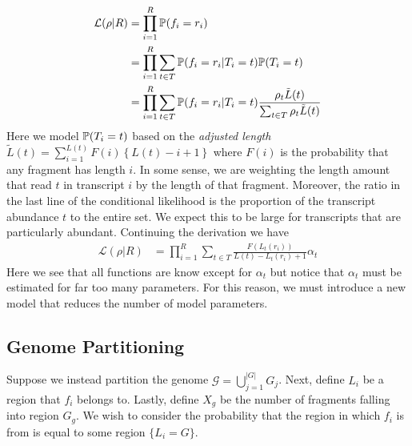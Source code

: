 \documentclass[11pt]{article}
\begin{document}
\begin{align*}
\mathcal{L}(\rho|R) &= \prod_{i=1}^{R}{\mathbb{P}}(f_i = r_i)\\
&= \prod_{i=1}^{R}\sum_{t\in T}{\mathbb{P}}(f_i = r_i|T_{i} = t){\mathbb{P}}(T_i = t)\\
&= \prod_{i=1}^{R}\sum_{t\in T}{\mathbb{P}}(f_i = r_i|T_{i} = t)\frac{\rho_t\tilde{L}(t)}{\sum_{t\in T}\rho_{t}\tilde{L}(t)}\\
\end{align*}
Here we model ${\mathbb{P}}(T_i = t)$ based on the \textit{adjusted length} $\tilde{L}(t) = \sum_{i = 1}^{L(t)}F(i)\left\{L(t) - i + 1\right\}$ where $F(i)$ is the probability that any fragment has length $i$. In some sense, we are weighting the length amount that read $t$ in transcript $i$ by the length of that fragment. Moreover, the ratio in the last line of the conditional likelihood is the proportion of the transcript abundance $t$ to the entire set. We expect this to be large for transcripts that are particularly abundant. Continuing the derivation we have 
\begin{align*}
\mathcal{L}(\rho|R)&=\prod_{i=1}^R\sum_{t \in T}\frac{F(L_{t}(r_i))}{L(t) - L_t(r_i)+1}\alpha_t 
\end{align*}
Here we see that all functions are know except for $\alpha_t$ but notice that $\alpha_t$ must be estimated for far too many parameters. For this reason, we must introduce a new model that reduces the number of model parameters. 

\subsection{Genome Partitioning}

Suppose we instead partition the genome $\mathcal{G} = \bigcup_{j=1}^{|G|} G_j$. Next, define $L_i$ be a region that $f_i$ belongs to. Lastly, define $X_g$ be the number of fragments falling into region $G_g$. We wish to consider the probability that the region in which $f_i$ is from is equal to some region $\{L_i = G\}$.
\end{document}
